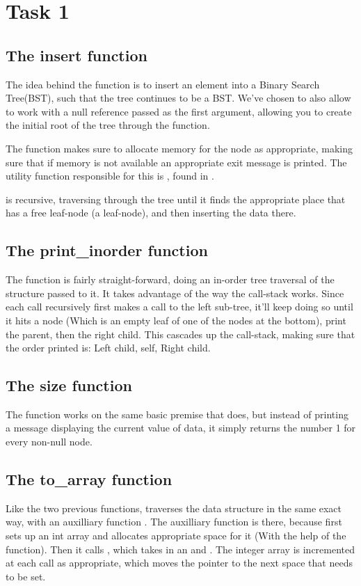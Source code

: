 \section{Task 1}
\subsection{The insert function}
The idea behind the  function is to insert an element into
a Binary Search Tree(BST), such that the tree continues to be a BST. We've
chosen to also allow  to work with a null reference passed as
the first argument, allowing you to create the initial root of the tree through
the function.

The function makes sure to allocate memory for the node as appropriate, making
sure that if memory is not available an appropriate exit message is printed. The
utility function responsible for this is , 
found in .

 is recursive, traversing through the tree until it finds the
appropriate place that has a free leaf-node (a  leaf-node), and
then inserting the data there.

\subsection{The print\_inorder function}
The  function is fairly straight-forward, doing an
in-order tree traversal of the  structure passed to it. It
takes advantage of the way the call-stack works. Since each call recursively
first makes a call to the left sub-tree, it'll keep doing so until it hits a
 node (Which is an empty leaf of one of the nodes at the bottom),
print the parent, then the right child. This cascades up the call-stack, making
sure that the order printed is: Left child, self, Right child.

\subsection{The size function}
The  function works on the same basic premise
that  does, but instead of printing a message
displaying the current value of data, it simply returns the number 1 for
every non-null node.

\subsection{The to\_array function}
Like the two previous functions,  traverses the data structure
in the same exact way, with an auxilliary function . The
auxilliary function is there, because  first sets up an int array
and allocates appropriate space for it (With the help of the  function).
Then it calls , which takes in an  and
. The integer array is incremented at each call as appropriate, which
moves the pointer to the next space that needs to be set.
